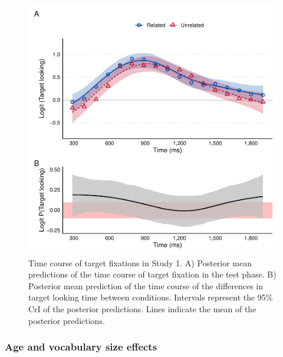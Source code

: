 \documentclass[
  12pt,
  b5paperpaper,
  twoside]{scrreprt}
\begin{document}
\begin{figure}

{\centering \includegraphics{chapters/03-chapter-3_files/figure-pdf/fig-epreds-oxf-1.pdf}

}

\caption{\label{fig-epreds-oxf}Time course of target fixations in Study
1. A) Posterior mean predictions of the time course of target fixation
in the test phase. B) Posterior mean prediction of the time course of
the differences in target looking time between conditions. Intervals
represent the 95\% CrI of the posterior predictions. Lines indicate the
mean of the posterior predictions.}

\end{figure}

\hypertarget{age-and-vocabulary-size-effects}{%
\subsubsection{Age and vocabulary size
effects}\label{age-and-vocabulary-size-effects}}
\end{document}
